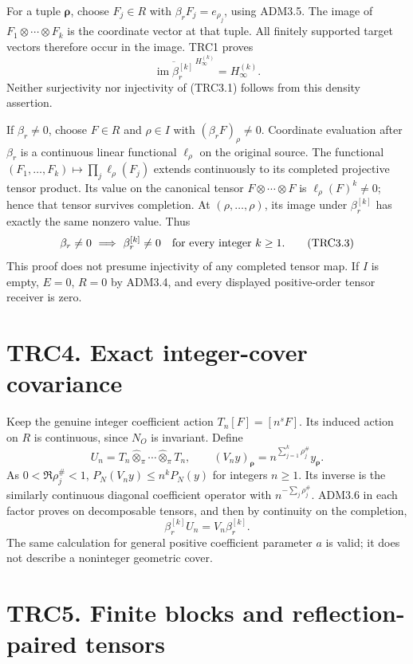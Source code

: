 For a tuple \(\boldsymbol\rho\), choose \(F_j\in R\) with
\(\beta_rF_j=e_{\rho_j}\), using ADM3.5. The image of
\(F_1\otimes\cdots\otimes F_k\) is the coordinate vector at that tuple.
All finitely supported target vectors therefore occur in the image. TRC1
proves \[
\overline{\operatorname{im}\beta_r^{[k]}}^{\,H_\infty^{(k)}}=H_\infty^{(k)}.
\tag{TRC3.2}
\] Neither surjectivity nor injectivity of (TRC3.1) follows from this
density assertion.

If \(\beta_r\ne0\), choose \(F\in R\) and \(\rho\in I\) with
\((\beta_rF)_\rho\ne0\). Coordinate evaluation after \(\beta_r\) is a
continuous linear functional \(\ell_\rho\) on the original source. The
functional \((F_1,\ldots,F_k)\mapsto\prod_j\ell_\rho(F_j)\) extends
continuously to its completed projective tensor product. Its value on
the canonical tensor \(F\otimes\cdots\otimes F\) is
\(\ell_\rho(F)^k\ne0\); hence that tensor survives completion. At
\((\rho,\ldots,\rho)\), its image under \(\beta_r^{[k]}\) has exactly
the same nonzero value. Thus \[
\beta_r\ne0\ \Longrightarrow\ \beta_r^{[k]}\ne0
\quad\hbox{for every integer }k\ge1.
\tag{TRC3.3}
\] This proof does not presume injectivity of any completed tensor map.
If \(I\) is empty, \(E=0\), \(R=0\) by ADM3.4, and every displayed
positive-order tensor receiver is zero.

\section{TRC4. Exact integer-cover
covariance}\label{trc4.-exact-integer-cover-covariance}

Keep the genuine integer coefficient action \(T_n[F]=[n^sF]\). Its
induced action on \(R\) is continuous, since \(N_O\) is invariant.
Define \[
U_n=T_n\widehat\otimes_\pi\cdots\widehat\otimes_\pi T_n,
\qquad
(V_ny)_{\boldsymbol\rho}=n^{\sum_{j=1}^k\rho_j^\#}y_{\boldsymbol\rho}.
\tag{TRC4.1}
\] As \(0<\Re\rho_j^\#<1\), \(P_N(V_ny)\le n^kP_N(y)\) for integers
\(n\ge1\). Its inverse is the similarly continuous diagonal coefficient
operator with \(n^{-\sum_j\rho_j^\#}\). ADM3.6 in each factor proves on
decomposable tensors, and then by continuity on the completion, \[
\beta_r^{[k]}U_n=V_n\beta_r^{[k]}.
\tag{TRC4.2}
\] The same calculation for general positive coefficient parameter \(a\)
is valid; it does not describe a noninteger geometric cover.

\section{TRC5. Finite blocks and reflection-paired
tensors}\label{trc5.-finite-blocks-and-reflection-paired-tensors}

